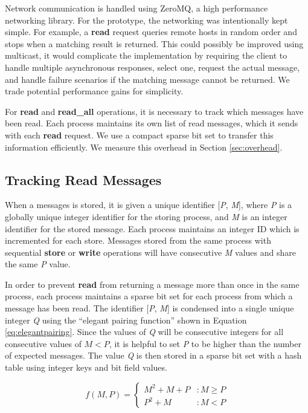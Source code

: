 \documentclass{llncs}
\begin{document}
Network communication is handled using ZeroMQ\cite{hintjens2013zeromq}, a high performance networking library. For the prototype, the networking was intentionally kept simple. For example, a \textbf{read} request queries remote hosts in random order and stops when a matching result is returned. This could possibly be improved using multicast, it would complicate the implementation by requiring the client to handle multiple asynchronous responses, select one, request the actual message, and handle failure scenarios if the matching message cannot be returned. We trade potential performance gains for simplicity. 

For \textbf{read} and \textbf{read\_all} operations, it is necessary to track which messages have been read. Each process maintains its own list of read messages, which it sends with each \textbf{read} request. We use a compact sparse bit set to transfer this information efficiently. We measure this overhead in Section \ref{sec:overhead}.


\subsection{Tracking Read Messages}\label{sec:readmessages}

    When a messages is stored, it is given a unique identifier [\textit{P}, \textit{M}], where \textit{P} is a globally unique integer identifier for the storing process, and \textit{M} is an integer identifier for the stored message. Each process maintains an integer ID which is incremented for each store. Messages stored from the same process with sequential \textbf{store} or \textbf{write} operations will have consecutive \textit{M} values and share the same \textit{P} value.

    In order to prevent \textbf{read} from returning a message more than once in the same process, each process maintains a sparse bit set for each process from which a message has been read. The identifier [\textit{P}, \textit{M}] is condensed into a single unique integer \textit{Q} using the ``elegant pairing function''\cite{szudzikelegant} shown in Equation \ref{eq:elegantpairing}. Since the values of \textit{Q} will be consecutive integers for all consecutive values of $M < P$, it is helpful to set \textit{P} to be higher than the number of expected messages. The value \textit{Q} is then stored in a sparse bit set with a hash table using integer keys and bit field values.

 \begin{equation}
   f(M,P) = \left\{
     \begin{array}{lr}
       M^{2} + M + P & : M \geq P \\
       P^{2} + M & : M < P
     \end{array}
   \right.
   \label{eq:elegantpairing}
\end{equation}
\end{document}
